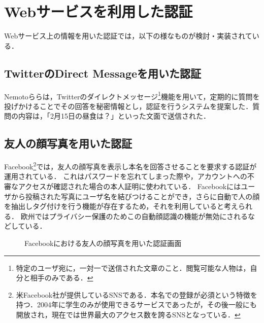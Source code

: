 \section{Webサービスを利用した認証}
Webサービス上の情報を用いた認証では，以下の様なものが検討・実装されている．

\subsection{TwitterのDirect Messageを用いた認証}\label{subsec:twitterDMAuth}
Nemotoら\cite{nemoto:2006-03-15}らは，Twitterのダイレクトメッセージ\footnote{特定のユーザ宛に，一対一で送信された文章のこと．閲覧可能な人物は，自分と相手のみである．}機能を用いて，定期的に質問を投げかけることでその回答を秘密情報とし，認証を行うシステムを提案した．質問の内容は，「2月15日の昼食は？」といった文面で送信された．

\subsection{友人の顔写真を用いた認証}\label{subsec:facebookFaceAuth}
Facebook\footnote{米Facebook社が提供しているSNSである．本名での登録が必須という特徴を持つ．2004年に学生のみが使用できるサービスであったが，その後一般にも開放され，現在では世界最大のアクセス数を誇るSNSとなっている．}では，友人の顔写真を表示し本名を回答させることを要求する認証が運用されている．
これはパスワードを忘れてしまった際や，アカウントへの不審なアクセスが確認された場合の本人証明に使われている．
Facebookにはユーザから投稿された写真にユーザ名を結びつけることができ，さらに自動で人の顔を抽出しタグ付けを行う機能が存在するため，それを利用していると考えられる．
欧州ではプライバシー保護のためこの自動顔認識の機能が無効にされるなどしている．

\begin{figure}[ht]
  \begin{center}
  \end{center}
  \caption{Facebookにおける友人の顔写真を用いた認証画面}
  \label{fig:facebookFaceAuth}
\end{figure}

